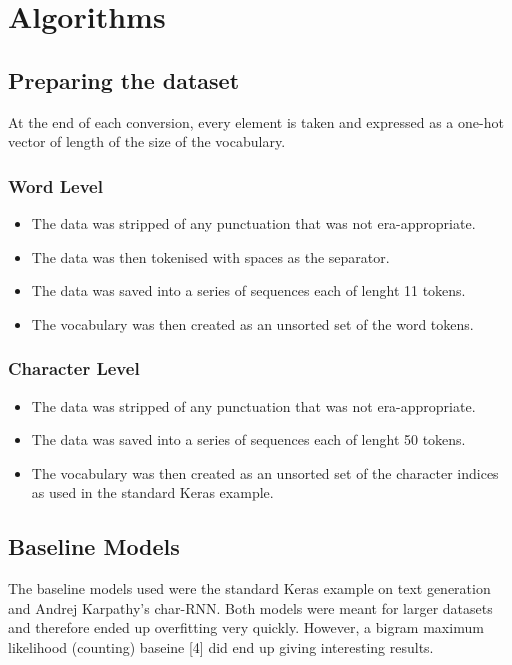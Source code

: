 \documentclass[15pt]{article}
\begin{document}

\section{Algorithms}
\subsection{Preparing the dataset}
At the end of each conversion, every element is taken and expressed as a one-hot vector of length  of the size of the vocabulary.
\subsubsection{Word Level}
\begin{itemize}
\item The data was stripped of any punctuation that was not era-appropriate.
\item The data was then tokenised with spaces as the separator.
\item The data was saved into a series of sequences each of lenght 11 tokens.
\item The vocabulary was then created as an unsorted set of the word tokens.
\end{itemize}
\subsubsection{Character Level}
\begin{itemize}
\item The data was stripped of any punctuation that was not era-appropriate.
\item The data was saved into a series of sequences each of lenght 50 tokens.
\item The vocabulary was then created as an unsorted set of the character indices as used in the standard Keras example.
\end{itemize}


\subsection*{Baseline Models}
The baseline models used were the standard Keras example on text generation and Andrej Karpathy's char-RNN. Both models were meant for larger datasets and therefore ended up overfitting very quickly. However, a  bigram maximum likelihood (counting) baseine [4] did end up giving interesting results.
\end{document}
